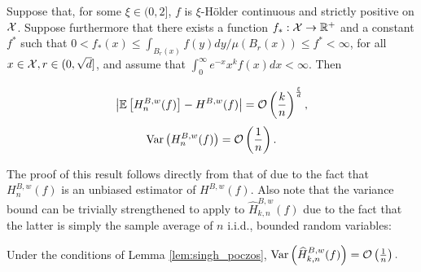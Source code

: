 \begin{lemma} \label{lem:singh_poczos}
    Suppose that, for some $\xi \in (0, 2]$, $f$ is $\xi$-H\"{o}lder continuous and strictly positive on $\mathcal{X}$. Suppose furthermore that there exists a function $f_* : \mathcal{X} \rightarrow \mathbb{R}^+$ and a constant $f^*$ such that $0 < f_*(x) \leq \int_{B_r(x)} f(y) dy / \mu(B_r(x)) \leq f^* < \infty$, for all $x \in \mathcal{X}, r \in (0, \sqrt{d}]$, and assume that $\int_0^{\infty} e^{-x} x^k f(x) dx < \infty$. Then
    \begin{multicols}{2}
        \noindent
        \small
        \vspace{-8mm}
        \begin{equation} \label{eqn:bias_bound}
            \left| \mathbb{E} \left[ H^{B,w}_n(f) \right] - H^{B,w}(f) \right| = \mathcal{O}\left( \frac{k}{n} \right)^{\frac{\xi}{d}},
        \end{equation}
        \normalsize
        \noindent
        \small
        \begin{equation} \label{eqn:var_bound}
            \text{Var} \left( H^{B,w}_n(f) \right) = \mathcal{O}\left( \frac{1}{n} \right).
        \end{equation}
        \normalsize
    \end{multicols}
\end{lemma}
%
The proof of this result follows directly from that of \citep[Thm. 5]{singh2016finite} due to the fact that $H^{B,w}_n(f)$ is an unbiased estimator of $H^{B,w}(f)$. Also note that the variance bound can be trivially strengthened to apply to $\widehat{H}^{B,w}_{k,n}(f)$ due to the fact that the latter is simply the sample average of $n$ i.i.d., bounded random variables:
%
\begin{corollary}
    Under the conditions of Lemma \ref{lem:singh_poczos}, $\text{Var} \left( \widehat{H}^{B,w}_{k,n}(f) \right) = \mathcal{O}\left( \frac{1}{n} \right).$
\end{corollary}

